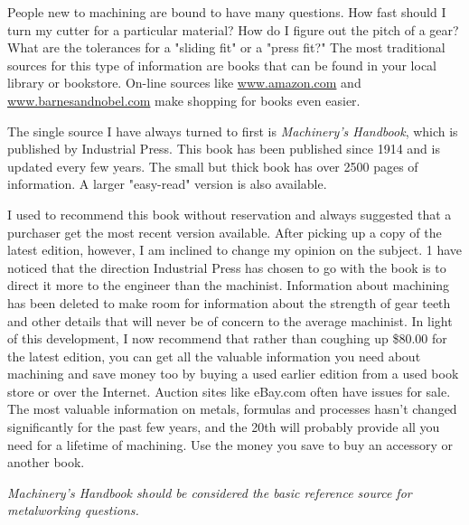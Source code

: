 \secdown


People new to machining are bound to have many questions. How fast should I turn
my cutter for a particular material? How do I figure out the pitch of a gear?
What are the tolerances for a "sliding fit" or a "press fit?" The most
traditional sources for this type of information are books that can be found in
your local library or bookstore. On-line sources like \url{www.amazon.com} and
\url{www.barnesandnobel.com} make shopping for books even easier.

The single source I have always turned to first is \emph{Machinery's Handbook},
which is published by Industrial Press. This book has been published since 1914
and is updated every few years. The small but thick book has over 2500 pages of
information. A larger "easy-read" version is also available.

I used to recommend this book without reservation and always suggested that a
purchaser get the most recent version available. After picking up a copy of the
latest edition, however, I am inclined to change my opinion on the subject. 1
have noticed that the direction Industrial Press has chosen to go with the book
is to direct it more to the engineer than the machinist. Information about
machining has been deleted to make room for information about the strength of
gear teeth and other details that will never be of concern to the average
machinist. In light of this development, I now recommend that rather than
coughing up \$80.00 for the latest edition, you can get all the valuable
information you need about machining and save money too by buying a used earlier
edition from a used book store or over the Internet. Auction sites like eBay.com
often have issues for sale. The most valuable information on metals, formulas
and processes hasn't changed significantly for the past few years, and the 20th
will probably provide all you need for a lifetime of machining. Use the money
you save to buy an accessory or another book.

\bigskip\textit{Machinery's Handbook should be considered the basic reference
source for metalworking questions.}


